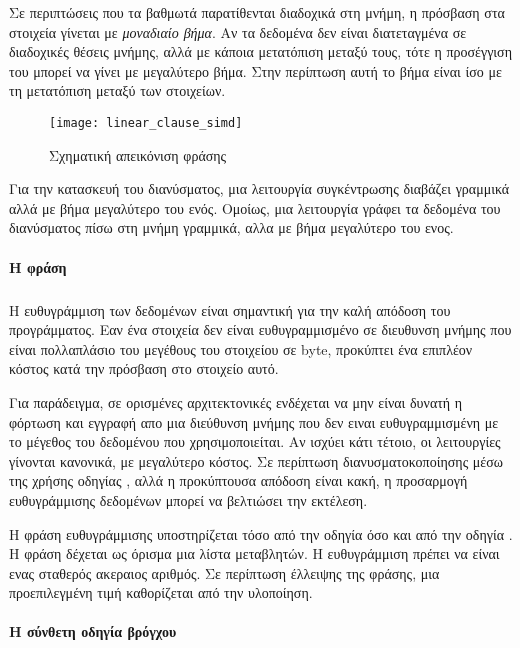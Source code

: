 Σε περιπτώσεις που τα βαθμωτά παρατίθενται διαδοχικά στη μνήμη, η πρόσβαση στα στοιχεία γίνεται με \emph{μοναδιαίο βήμα}. Αν τα δεδομένα δεν είναι διατεταγμένα σε διαδοχικές θέσεις μνήμης, αλλά με  κάποια μετατόπιση μεταξύ τους, τότε η προσέγγιση του μπορεί να γίνει με μεγαλύτερο βήμα. Στην περίπτωση αυτή το βήμα είναι ίσο με τη μετατόπιση μεταξύ των στοιχείων.

\begin{figure}[h]
\texttt{[image: linear\_clause\_simd]}
\centering
\captionsetup{justification=centering, singlelinecheck=false}
	\caption{Σχηματική απεικόνιση φράσης \emph{}}
\label{fig:linear_clause_simd}
\end{figure}

Για την κατασκευή του διανύσματος, μια λειτουργία συγκέντρωσης διαβάζει γραμμικά αλλά με βήμα μεγαλύτερο του ενός. Ομοίως, μια λειτουργία γράφει τα δεδομένα του διανύσματος πίσω στη μνήμη γραμμικά, αλλα με βήμα μεγαλύτερο του ενος.


\paragraph{H φράση \emph{}}
\subparagraph{}
Η ευθυγράμμιση των δεδομένων είναι σημαντική για την καλή απόδοση του προγράμματος. Εαν ένα στοιχεία δεν είναι ευθυγραμμισμένο σε διευθυνση μνήμης που είναι πολλαπλάσιο του μεγέθους του στοιχείου σε byte, προκύπτει ένα επιπλέον κόστος  κατά την πρόσβαση στο στοιχείο αυτό.

Για παράδειγμα, σε ορισμένες αρχιτεκτονικές ενδέχεται να μην είναι δυνατή η φόρτωση και εγγραφή απο μια διεύθυνση μνήμης που δεν ειναι ευθυγραμμισμένη με το μέγεθος του δεδομένου που χρησιμοποιείται. Αν ισχύει κάτι τέτοιο, οι λειτουργίες γίνονται κανονικά, με μεγαλύτερο κόστος. Σε περίπτωση διανυσματοκοποίησης μέσω της χρήσης οδηγίας \emph{}, αλλά η προκύπτουσα απόδοση είναι κακή, η προσαρμογή ευθυγράμμισης δεδομένων μπορεί να βελτιώσει την εκτέλεση.

Η φράση ευθυγράμμισης υποστηρίζεται τόσο από την οδηγία \emph{} όσο και από την οδηγία \emph{}. Η φράση δέχεται ως όρισμα μια λίστα μεταβλητών. Η ευθυγράμμιση πρέπει να είναι ενας σταθερός ακεραιος αριθμός. Σε περίπτωση έλλειψης της φράσης, μια προεπιλεγμένη τιμή καθορίζεται από την υλοποίηση.

\paragraph{Η σύνθετη οδηγία βρόγχου \emph{}}
\subparagraph{}

